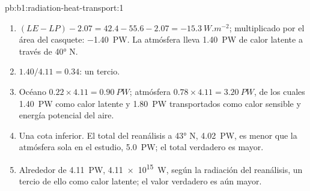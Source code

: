 \begin{solution}{pb:b1:radiation-heat-transport:1}
\begin{enumerate}
  \item $(LE - LP) - 2.07 = 42.4 - 55.6 - 2.07 = \qty{-15.3}{W.m^{-2}}$; multiplicado por el
        área del casquete: \qty{-1.40}{PW}. La atmósfera lleva \qty{1.40}{PW}
        de calor latente a través de \ang{40} N.
  \item $1.40/4.11 = 0.34$: un tercio.
  \item Océano $0.22 \times 4.11 = \qty{0.90}{PW}$; atmósfera $0.78 \times 4.11 =
        \qty{3.20}{PW}$, de los cuales \qty{1.40}{PW} como calor latente y \qty{1.80}{PW}
        transportados como calor sensible y energía potencial del aire.
  \item Una cota inferior. El total del reanálisis a \ang{43} N, \qty{4.02}{PW}, es menor que la atmósfera sola en el estudio, \qty{5.0}{PW}; el total verdadero es mayor.
  \item Alrededor de \qty{4.11}{PW}, \qty{4.11e15}{W}, según la radiación del reanálisis, un tercio de ello como calor latente; el valor verdadero es aún mayor.
\end{enumerate}
\end{solution}
